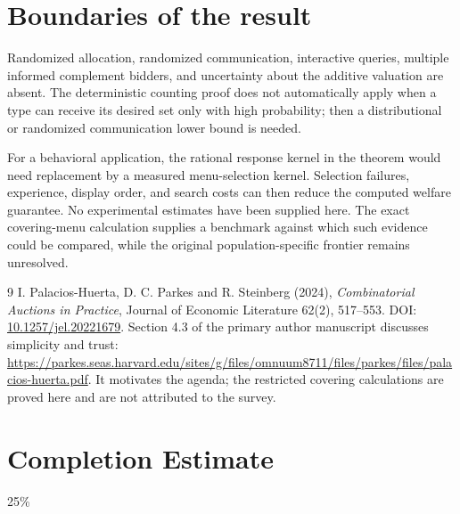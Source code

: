 \documentclass[11pt,a4paper]{article}
\theoremstyle{remark}
\begin{document}
\section{Boundaries of the result}
Randomized allocation, randomized communication, interactive queries, multiple informed complement bidders, and uncertainty about the additive valuation are absent. The deterministic counting proof does not automatically apply when a type can receive its desired set only with high probability; then a distributional or randomized communication lower bound is needed.

For a behavioral application, the rational response kernel in the theorem would need replacement by a measured menu-selection kernel. Selection failures, experience, display order, and search costs can then reduce the computed welfare guarantee. No experimental estimates have been supplied here. The exact covering-menu calculation supplies a benchmark against which such evidence could be compared, while the original population-specific frontier remains unresolved.

\begin{thebibliography}{9}
 I. Palacios-Huerta, D. C. Parkes and R. Steinberg (2024), \emph{Combinatorial Auctions in Practice}, Journal of Economic Literature 62(2), 517--553. DOI: \href{https://doi.org/10.1257/jel.20221679}{10.1257/jel.20221679}. Section 4.3 of the primary author manuscript discusses simplicity and trust: \url{https://parkes.seas.harvard.edu/sites/g/files/omnuum8711/files/parkes/files/palacios-huerta.pdf}. It motivates the agenda; the restricted covering calculations are proved here and are not attributed to the survey.
\end{thebibliography}

\section{Completion Estimate}
25\%
\end{document}
